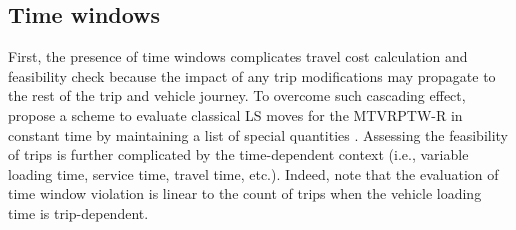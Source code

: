 \subsection{Time windows}
First, the presence of time windows complicates travel cost calculation and feasibility check because the impact of any trip modifications may propagate to the rest of the trip and vehicle journey.  To overcome such cascading effect, \cite{cattaruzza2016multi} propose a scheme to evaluate classical LS moves for the MTVRPTW-R in constant time by maintaining a list of special quantities .  Assessing the feasibility of trips is further complicated by the time-dependent context (i.e., variable loading time, service time, travel time, etc.).  Indeed, \cite{cattaruzza2016multi} note that the evaluation of time window violation is linear to the  count of trips  when the vehicle loading time is trip-dependent.  
\newline


